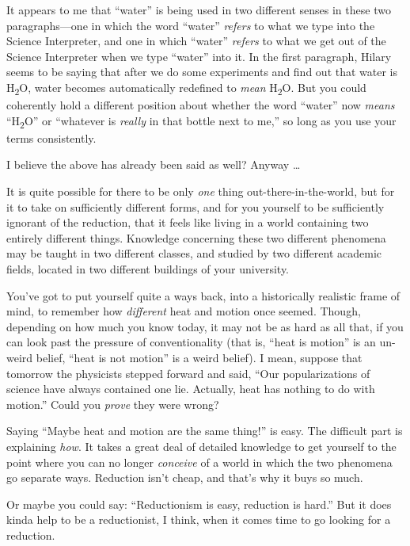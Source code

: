 {
 It appears to me that ``water''
is being used in two different senses in these two paragraphs---one in
which the word ``water''
\textit{refers} to what we type into the Science Interpreter, and one
in which ``water'' \textit{refers}
to what we get out of the Science Interpreter when we type
``water'' into it. In the first
paragraph, Hilary seems to be saying that after we do some experiments
and find out that water is H\textsubscript{2}O, water becomes
automatically redefined to \textit{mean} H\textsubscript{2}O. But you
could coherently hold a different position about whether the word
``water'' now \textit{means}
``H\textsubscript{2}O'' or
``whatever is \textit{really} in that bottle next to
me,'' so long as you use your terms consistently.}

{
 I believe the above has already been said as well? Anyway \ldots}

{
 It is quite possible for there to be only \textit{one} thing
out-there-in-the-world, but for it to take on sufficiently different
forms, and for you yourself to be sufficiently ignorant of the
reduction, that it feels like living in a world containing two entirely
different things. Knowledge concerning these two different phenomena
may be taught in two different classes, and studied by two different
academic fields, located in two different buildings of your
university.}

{
 You've got to put yourself quite a ways back, into
a historically realistic frame of mind, to remember how
\textit{different} heat and motion once seemed. Though, depending on
how much you know today, it may not be as hard as all that, if you can
look past the pressure of conventionality (that is,
``heat is motion'' is an un-weird
belief, ``heat is not motion'' is a
weird belief). I mean, suppose that tomorrow the physicists stepped
forward and said, ``Our popularizations of science
have always contained one lie. Actually, heat has nothing to do with
motion.'' Could you \textit{prove} they were wrong?}

{
 Saying ``Maybe heat and motion are the same
thing!'' is easy. The difficult part is explaining
\textit{how}. It takes a great deal of detailed knowledge to get
yourself to the point where you can no longer \textit{conceive} of a
world in which the two phenomena go separate ways. Reduction
isn't cheap, and that's why it buys so
much.}

{
 Or maybe you could say: ``Reductionism is easy,
reduction is hard.'' But it does kinda help to be a
reductionist, I think, when it comes time to go looking for a
reduction.}

